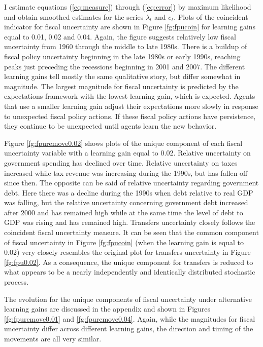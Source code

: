 \documentclass[11pt]{article}
\begin{document}
I estimate equations (\ref{eq:measure}) through (\ref{eq:error}) by maximum likelihood and obtain smoothed estimates for the series $\lambda_t$ and $e_t$.  Plots of the coincident indicator for fiscal uncertainty are shown in Figure \ref{fg:fpucoin} for learning gains equal to 0.01, 0.02 and 0.04.  Again, the figure suggests relatively low fiscal uncertainty from 1960 through the middle to late 1980s.  There is a buildup of fiscal policy uncertainty beginning in the late 1980s or early 1990s, reaching peaks just preceding the recessions beginning in 2001 and 2007.  The different learning gains tell mostly the same qualitative story, but differ somewhat in magnitude.  The largest magnitude for fiscal uncertainty is predicted by the expectations framework with the lowest learning gain, which is expected.  Agents that use a smaller learning gain adjust their expectations more slowly in response to unexpected fiscal policy actions.  If these fiscal policy actions have persistence, they continue to be unexpected until agents learn the new behavior.  

Figure \ref{fg:fpuremove0.02} shows plots of the unique component of each fiscal uncertainty variable with a learning gain equal to 0.02.  Relative uncertainty on government spending has declined over time.  Relative uncertainty on taxes increased while tax revenue was increasing during the 1990s, but has fallen off since then.  The opposite can be said of relative uncertainty regarding government debt.  Here there was a decline during the 1990s when debt relative to real GDP was falling, but the relative uncertainty concerning government debt increased after 2000 and has remained high while at the same time the level of debt to GDP was rising and has remained high.  Transfers uncertainty closely follows the coincident fiscal uncertainty measure.  It can be seen that the common component of fiscal uncertainty in Figure \ref{fg:fpucoin} (when the learning gain is equal to 0.02) very closely resembles the original plot for transfers uncertainty in Figure \ref{fg:fpu0.02}.  As a consequence, the unique component for transfers is reduced to what appears to be a nearly independently and identically distributed stochastic process. 

The evolution for the unique components of fiscal uncertainty under alternative learning gains are discussed in the appendix and shown in Figures \ref{fg:fpuremove0.01} and \ref{fg:fpuremove0.04}.  Again, while the magnitudes for fiscal uncertainty differ across different learning gains, the direction and timing of the movements are all very similar.
\end{document}
